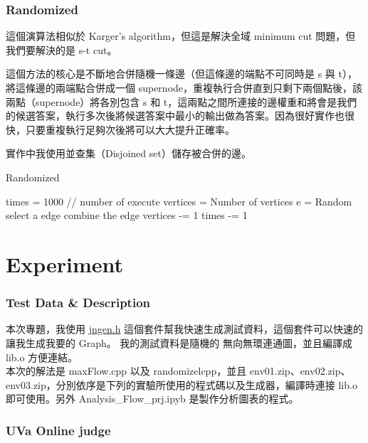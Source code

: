 \documentclass[12pt]{article}
\begin{document}
	\section{Randomized}
	這個演算法相似於 Karger's algorithm，但這是解決全域 minimum cut 問題，但我們要解決的是 s-t cut。
	
	這個方法的核心是不斷地合併隨機一條邊（但這條邊的端點不可同時是 s 與 t），將這條邊的兩端點合併成一個 supernode，重複執行合併直到只剩下兩個點後，該兩點（supernode）將各別包含 s 和 t，這兩點之間所連接的邊權重和將會是我們的候選答案，執行多次後將候選答案中最小的輸出做為答案。因為很好實作也很快，只要重複執行足夠次後將可以大大提升正確率。 
	
	實作中我使用並查集（Disjoined set）儲存被合併的邊。
	
	\begin{algorithm}[H]
		\caption{Randomized}
		\begin{algorithmic}
			\State times = 1000 // number of execute
			\State vertices =  Number of vertices 
					\State e = Random select a edge 
						\State combine the edge
						\State vertices -= 1
					\EndIf
					\State times -= 1
				\EndWhile
			\EndWhile
		\end{algorithmic}
	\end{algorithm}
	
	\part{Experiment}
	\section{Test Data \& Description}
	
	本次專題，我使用 \href{https://github.com/ifsmirnov/jngen}{jngen.h} 這個套件幫我快速生成測試資料，這個套件可以快速的讓我生成我要的 Graph。
	我的測試資料是隨機的 無向無環連通圖，並且編譯成 lib.o 方便連結。\\
	
	
	本次的解法是 maxFlow.cpp 以及 randomizelcpp，並且 env01.zip、env02.zip、env03.zip，分別依序是下列的實驗所使用的程式碼以及生成器，編譯時連接 lib.o 即可使用。另外 Analysis\_Flow\_prj.ipyb 是製作分析圖表的程式。
	\section{UVa Online judge}
	
\end{document}
